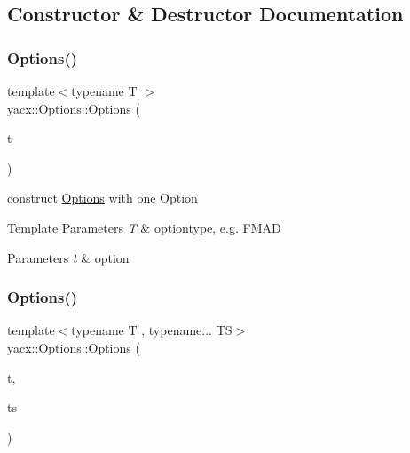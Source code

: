 \subsection{Constructor \& Destructor Documentation}
\mbox{\label{classyacx_1_1_options_a73264e0171ac65cdbfb490cdf2b31b58}} 
\subsubsection{\texorpdfstring{Options()}{Options()}\hspace{0.1cm}{\footnotesize\ttfamily [1/2]}}
{\footnotesize\ttfamily template$<$typename T $>$ \\
yacx\+::\+Options\+::\+Options (\begin{DoxyParamCaption}\item[{const T \&}]{t }\end{DoxyParamCaption})}

construct \hyperlink{classyacx_1_1_options}{Options} with one Option 
\begin{DoxyTemplParams}{Template Parameters}
{\em T} & optiontype, e.\+g. F\+M\+AD \\
\hline
\end{DoxyTemplParams}

\begin{DoxyParams}{Parameters}
{\em t} & option \\
\hline
\end{DoxyParams}
\mbox{\label{classyacx_1_1_options_a50cf08d2d6c3923123c493df1f0946a7}} 
\subsubsection{\texorpdfstring{Options()}{Options()}\hspace{0.1cm}{\footnotesize\ttfamily [2/2]}}
{\footnotesize\ttfamily template$<$typename T , typename... TS$>$ \\
yacx\+::\+Options\+::\+Options (\begin{DoxyParamCaption}\item[{const T \&}]{t,  }\item[{const TS \&...}]{ts }\end{DoxyParamCaption})}

